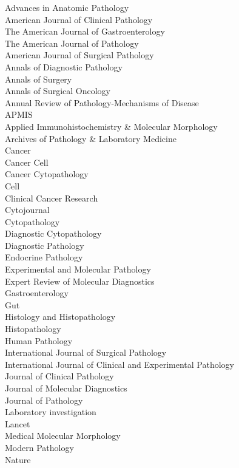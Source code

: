 \documentclass[]{article}
\begin{document}
Advances in Anatomic Pathology\\
American Journal of Clinical Pathology\\
The American Journal of Gastroenterology\\
The American Journal of Pathology\\
American Journal of Surgical Pathology\\
Annals of Diagnostic Pathology\\
Annals of Surgery\\
Annals of Surgical Oncology\\
Annual Review of Pathology-Mechanisms of Disease\\
APMIS\\
Applied Immunohistochemistry \& Molecular Morphology\\
Archives of Pathology \& Laboratory Medicine\\
Cancer\\
Cancer Cell\\
Cancer Cytopathology\\
Cell\\
Clinical Cancer Research\\
Cytojournal\\
Cytopathology\\
Diagnostic Cytopathology\\
Diagnostic Pathology\\
Endocrine Pathology\\
Experimental and Molecular Pathology\\
Expert Review of Molecular Diagnostics\\
Gastroenterology\\
Gut\\
Histology and Histopathology\\
Histopathology\\
Human Pathology\\
International Journal of Surgical Pathology\\
International Journal of Clinical and Experimental Pathology\\
Journal of Clinical Pathology\\
Journal of Molecular Diagnostics\\
Journal of Pathology\\
Laboratory investigation\\
Lancet\\
Medical Molecular Morphology\\
Modern Pathology\\
Nature\\
\end{document}
